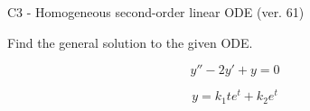 \begin{exercise}
  \begin{exerciseTitle}C3 - Homogeneous second-order linear ODE (ver. 61)\end{exerciseTitle}
  \begin{exerciseStatement}
    
Find the general solution to the given ODE.

    
\[y''-2y'+y = 0\]

  \end{exerciseStatement}
  \begin{exerciseAnswer}
    
\[y= k_{1} t e^{t} + k_{2} e^{t}\]

  \end{exerciseAnswer}
\end{exercise}